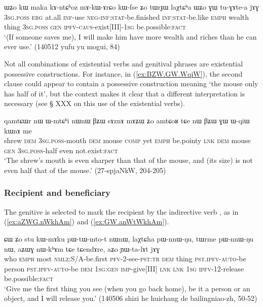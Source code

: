 \begin{exe} 
\ex \label{ex:WZo.GW.tuGAtea} 
\gll ɯʑo kɯ maka kɤ-ntɕʰoz mɤ-kɯ-ɤrɕo kɯ-fse ʑo tɯrɟɯ laχtɕʰa ɯʑo ɣɯ tu-ɣɤte-a jɤɣ \\ 
\textsc{3sg}.\textsc{poss} \textsc{erg} at.all \textsc{inf}-use \textsc{neg}-\textsc{inf}:\textsc{stat}-be.finished \textsc{inf}:\textsc{stat}-be.like \textsc{emph} wealth thing \textsc{3sg}.\textsc{poss} \textsc{gen} \textsc{ipfv}-\textsc{caus}-exist[III]-\textsc{1sg} be.possible:\textsc{fact} \\ 
\glt `(If someone saves me), I will make him have more wealth and riches than he can ever use.' (140512 yufu yu mogui, 84) 
\end{exe} 

Not all combinations of existential verbs and genitival phrases are existential possessive constructions. For instance, in (\ref{ex:BZW.GW.WqiW}), the second clause could appear to contain a possessive construction meaning `the mouse only has half of it', but the context makes it clear that a different interpretation is necessary (see § XXX on this use of the existential verbs).

\begin{exe}
\ex \label{ex:BZW.GW.WqiW}
\gll qamtɕɯr nɯ ɯ-mtɕʰi nɯnɯ βʑɯ sɤznɤ mɤʑɯ ʑo amtɕoʁ tɕe nɯ βʑɯ ɣɯ ɯ-qiɯ kɯnɤ me \\
shrew \textsc{dem} \textsc{3sg}.\textsc{poss}-mouth \textsc{dem} mouse \textsc{comp} yet \textsc{emph} be.pointy \textsc{lnk} \textsc{dem} mouse \textsc{gen} \textsc{3sg}.\textsc{poss}-half even not.exist:\textsc{fact} \\
\glt `The shrew's mouth is even sharper than that of the mouse, and (its size) is not even half that of the mouse.' (27-spjaNkW, 204-205)
\end{exe}

 
\subsubsection{Recipient and beneficiary} \label{sec:gen.beneficiary}
 
The genitive is selected to mark the recipient by the indirective verb , as in (\ref{ex:aZWG.nWkhAm}) and (\ref{ex:GW.anWtWkhAm}).   

\begin{exe}
\ex \label{ex:aZWG.nWkhAm}
 \gll ɕɯ ʑo stu kɯ-mɤku pɯ-tɯ-mto-t nɯnɯ, laχtɕha pɯ-nnɯ-ŋu, tɯrme pɯ-nnɯ-ŋu nɯ, aʑɯɣ nɯ-kʰɤm tɕe tɕendɤre, aʑo ɲɯ-ta-lɤt jɤɣ \\
 who \textsc{emph} most \textsc{nmlz}:S/A-be.first \textsc{pfv}-2-see-\textsc{pst}:\textsc{tr} \textsc{dem}  thing \textsc{pst}.\textsc{ipfv}-\textsc{auto}-be   person \textsc{pst}.\textsc{ipfv}-\textsc{auto}-be \textsc{dem} \textsc{1sg}:\textsc{gen} \textsc{imp}-give[III] \textsc{lnk} \textsc{lnk} \textsc{1sg} \textsc{ipfv}-1\fl{}2-release be.possible:\textsc{fact} \\
 \glt `Give me the first thing you see (when you go back home), be it a person or an object, and I will release you.' (140506 shizi he huichang de bailingniao-zh, 50-52)
\end{exe}

